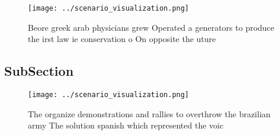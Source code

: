 \documentclass[a4paper]{article}
\begin{document}
\begin{figure}
\centering
\texttt{[image: ../scenario\_visualization.png]}
\caption{Beore greek arab physicians grew Operated a generators to produce the irst law ie conservation o On opposite the uture 
}
\end{figure}
 
\subsection{SubSection}

\begin{figure}
\centering
\texttt{[image: ../scenario\_visualization.png]}
\caption{The organize demonstrations and rallies to overthrow the brazilian army The solution spanish which represented the voic
}
\end{figure}
 
\end{document}
